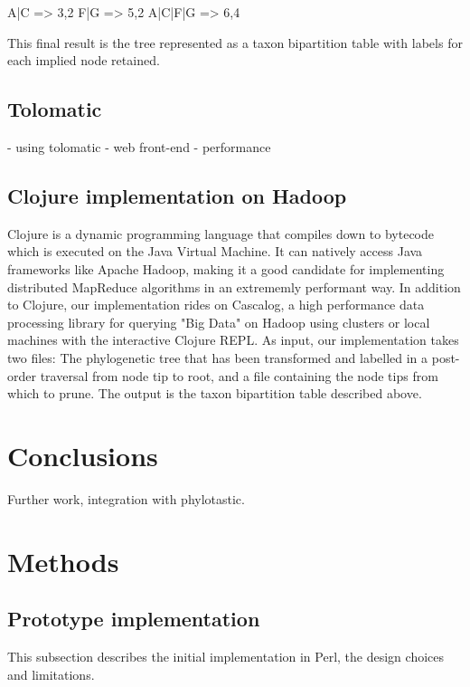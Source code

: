 \documentclass[10pt]{bmc_article}
\newenvironment{bmcformat}{\begin{raggedright}\baselineskip20pt\sloppy\setboolean{publ}{false}}{\end{raggedright}\baselineskip20pt\sloppy}
\begin{document}
\begin{bmcformat}
		 A|C     => 3,2
		 F|G     => 5,2
		 A|C|F|G => 6,4

		This final result is the tree represented as a taxon bipartition table 
		with labels for each implied node retained.

  \subsection*{Tolomatic}
  - using tolomatic
  - web front-end
  - performance

  \subsection*{Clojure implementation on Hadoop}

  Clojure is a dynamic programming language that compiles down to bytecode which is executed on the Java Virtual Machine. It can natively access Java frameworks like Apache Hadoop, making it a good candidate for implementing distributed MapReduce algorithms in an extrememly performant way. In addition to Clojure, our implementation rides on Cascalog, a high performance data processing library for querying "Big Data" on Hadoop using clusters or local machines with the interactive Clojure REPL. As input, our implementation takes two files: The phylogenetic tree that has been transformed and labelled in a post-order traversal from node tip to root, and a file containing the node tips from which to prune. The output is the  taxon bipartition table described above.

\section*{Conclusions}
  Further work, integration with phylotastic.
  
\section*{Methods}

  \subsection*{Prototype implementation}
	This subsection describes the initial implementation in Perl,
	the design choices and limitations.


\end{bmcformat}
\end{document}
